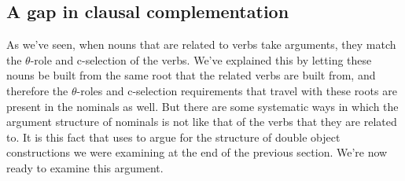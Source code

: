 \subsection{A gap in clausal complementation} 
\label{sub:clausalcomplementation}

As we've seen, when nouns that are related to verbs take arguments, they match the $\theta$-role and c-selection of the verbs. We've explained this by letting these nouns be built from the same root that the related verbs are built from, and therefore the $\theta$-roles and c-selection requirements that travel with these roots are present in the nominals as well. But there are some systematic ways in which the argument structure of nominals is not like that of the verbs that they are related to. It is this fact that \citet{Kayne:1984d} uses to argue for the structure of double object constructions we were examining at the end of the previous section. We're now ready to examine this argument.

